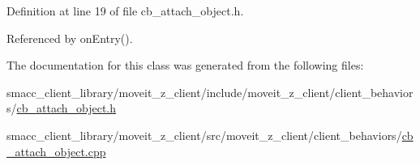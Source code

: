 Definition at line 19 of file cb\+\_\+attach\+\_\+object.\+h.



Referenced by on\+Entry().



The documentation for this class was generated from the following files\+:\begin{DoxyCompactItemize}
\item 
smacc\+\_\+client\+\_\+library/moveit\+\_\+z\+\_\+client/include/moveit\+\_\+z\+\_\+client/client\+\_\+behaviors/\hyperlink{cb__attach__object_8h}{cb\+\_\+attach\+\_\+object.\+h}\item 
smacc\+\_\+client\+\_\+library/moveit\+\_\+z\+\_\+client/src/moveit\+\_\+z\+\_\+client/client\+\_\+behaviors/\hyperlink{cb__attach__object_8cpp}{cb\+\_\+attach\+\_\+object.\+cpp}\end{DoxyCompactItemize}
